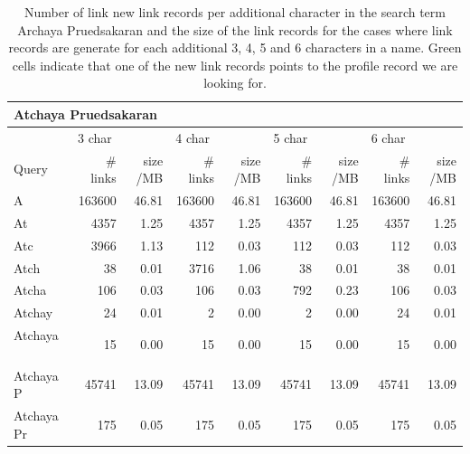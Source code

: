 \begin{table}[!htb]
\caption{Number of link new link records per additional character in the search term Archaya Pruedsakaran and the size of the link records for the cases where link records are generate for each additional 3, 4, 5 and 6 characters in a name. Green cells indicate that one of the new link records points to the profile record we are looking for.}
\begin{center}
\scriptsize{
  \begin{tabular}{ | l | r | r | r | r | r | r | r | r | }
    \hline                       
    \multicolumn{9}{|l|}{\textbf{Atchaya Pruedsakaran}} \\ 
    \hline                       
    \hline  
    & \multicolumn{2}{l|}{3 char} & \multicolumn{2}{l|}{4 char} & \multicolumn{2}{l|}{5 char} & \multicolumn{2}{l|}{6 char}  \\
    Query & \# links & size /MB & \# links & size /MB & \# links & size /MB & \# links & size /MB  \\
    \hline  
    A                         & 163600 & 46.81 & 163600 & 46.81 & 163600 & 46.81 & 163600 & 46.81 \\
    \hline                   
    At                        & 4357 & 1.25 & 4357 & 1.25 & 4357 & 1.25 & 4357 & 1.25 \\
    \hline                   
    Atc                       & \cellcolor{green} 3966 & 1.13 & 112 & 0.03 & 112 & 0.03 & 112 & 0.03 \\
    \hline                   
    Atch                      & 38 & 0.01 & \cellcolor{green} 3716 & 1.06 & 38 & 0.01 & 38 & 0.01 \\
    \hline                   
    Atcha                     & 106 & 0.03 & 106 & 0.03 & \cellcolor{green} 792 & 0.23 & 106 & 0.03 \\
    \hline                   
    Atchay                    & \cellcolor{green} 24 & 0.01 & 2 & 0.00 & 2 & 0.00 & \cellcolor{green} 24 & 0.01 \\
    \hline                   
    Atchaya                   & \cellcolor{green} 15 & 0.00 & \cellcolor{green} 15 & 0.00 & \cellcolor{green} 15 & 0.00 & \cellcolor{green} 15 & 0.00 \\
    \hline                   
    Atchaya P                 & 45741 & 13.09 & 45741 & 13.09 & 45741 & 13.09 & 45741 & 13.09 \\
    \hline                   
    Atchaya Pr                & 175 & 0.05 & 175 & 0.05 & 175 & 0.05 & 175 & 0.05 \\

\end{tabular}}
\end{center}
\end{table}
